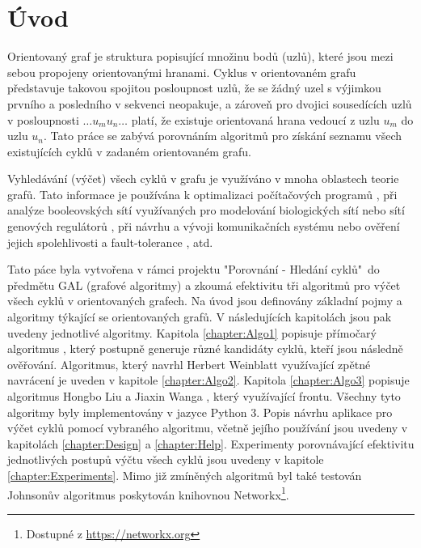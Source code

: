 
\chapter{Úvod}
    Orientovaný graf je struktura popisující množinu bodů (uzlů), které jsou mezi sebou propojeny orientovanými hranami. Cyklus v orientovaném grafu představuje takovou spojitou posloupnost uzlů, že se žádný uzel s výjimkou prvního a posledního v sekvenci neopakuje, a zároveň pro dvojici sousedících uzlů v posloupnosti $\dots u_m u_n \dots$ platí, že existuje orientovaná hrana vedoucí z uzlu $u_m$ do uzlu $u_n$. Tato práce se zabývá porovnáním algoritmů pro získání seznamu všech existujících cyklů v zadaném orientovaném grafu.

    Vyhledávání (výčet) všech cyklů v grafu je využíváno v mnoha oblastech teorie grafů. Tato informace je používána k optimalizaci počítačových programů \cite{Program_optimization}, při analýze booleovských sítí využívaných pro modelování biologických sítí nebo sítí genových regulátorů \cite{Biology}, při návrhu a vývoji komunikačních systému \cite{How_loopy_is_your_network} nebo ověření jejich spolehlivosti a fault-tolerance \cite{Network_Reliability}, atd.

    Tato páce byla vytvořena v rámci projektu "Porovnání - Hledání cyklů"~do předmětu GAL (grafové algoritmy) a zkoumá efektivitu tři algoritmů pro výčet všech cyklů v orientovaných grafech. Na úvod jsou definovány základní pojmy a algoritmy týkající se orientovaných grafů. V následujících kapitolách jsou pak uvedeny jednotlivé algoritmy. Kapitola \ref{chapter:Algo1} popisuje přímočarý algoritmus \cite[str. 287]{Book_algo}, který postupně generuje různé kandidáty cyklů, kteří jsou následně ověřování. Algoritmus, který navrhl Herbert Weinblatt využívající zpětné navrácení \cite{A_new_search_algorithm} je uveden v kapitole \ref{chapter:Algo2}. Kapitola \ref{chapter:Algo3} popisuje algoritmus Hongbo Liu a Jiaxin Wanga \cite{A_new_way_to_enumerate_cycles_in_graph}, který využívající frontu. Všechny tyto algoritmy byly implementovány v jazyce Python 3. Popis návrhu aplikace pro výčet cyklů pomocí vybraného algoritmu, včetně jejího používání jsou uvedeny v kapitolách \ref{chapter:Design} a \ref{chapter:Help}. Experimenty porovnávající efektivitu jednotlivých postupů výčtu všech cyklů jsou uvedeny v kapitole \ref{chapter:Experiments}. Mimo již zmíněných algoritmů byl také testován Johnsonův algoritmus \cite{Johnson_1975} poskytován knihovnou Networkx\footnote{Dostupné z \url{https://networkx.org}}.

